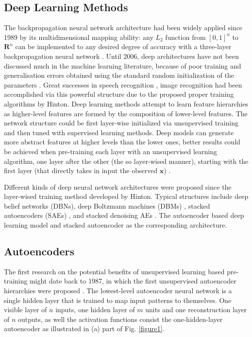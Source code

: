 \documentclass[journal]{IEEEtran}
\begin{document}
\subsection{Deep Learning Methods}
The backpropagation neural network architecture had been widely applied since 1989 by its multidimensional mapping ability: any $L_2$ function from $[0, 1]^n$ to $\mathbf{R}^n$ can be implemented to any desired degree of accuracy with a three-layer backpropagation neural network \cite{hecht}. Until 2006, deep architectures have not been discussed much in the machine learning literature, because of poor training and generalisation errors obtained using the standard random initialization of the parameters \cite{bengio2009}. Great successes in speech recognition \cite{hinton2012deep}, image recognition\cite{ciresan2010deep} had been accomplished via this powerful structure due to the proposed proper training algorithms by Hinton\cite{hinton}. Deep learning methods attempt to learn feature hierarchies as higher-level features are formed by the composition of lower-level features. The network structure could be first layer-wise initialized via unsupervised training and then tuned with supervised learning methods. Deep models can generate more abstract features at higher levels than the lower ones,  better results could be achieved when pre-training each layer with an unsupervised learning algorithm, one layer after the other (the so layer-wised manner), starting with the first layer (that directly takes in input the observed $\mathbf{x}$) \cite{bengio2009}.

Different kinds of deep neural network architectures were proposed since the layer-wised training method developed by Hinton. Typical structures include deep belief networks (DBNs)\cite{hinton2006fast}, deep Boltzmann machines (DBMs) \cite{salakhutdinov2009deep}, stacked autoencoders (SAEs) \cite{bengio2007greedy}, and stacked denoising AEs \cite{vincent2010stacked}. The autoencoder based deep learning model and stacked autoencoder as the corresponding architecture.
 
\subsection{Autoencoders}
The first research on the potential benefits of unsupervised learning based pre-training might date back to 1987, in which the first unsupervised autoencoder hierarchies were proposed \cite{ballard1987modular}. The lowest-level autoencoder neural network is a single hidden layer that is trained to map input patterns to themselves. One visible layer of $n$ inputs, one hidden layer of $m$ units and one reconstruction layer of $n$ outputs, as well the activation functions consist the one-hidden-layer autoencoder as illustrated in (a) part of Fig. \ref{figure1}.
\end{document}
